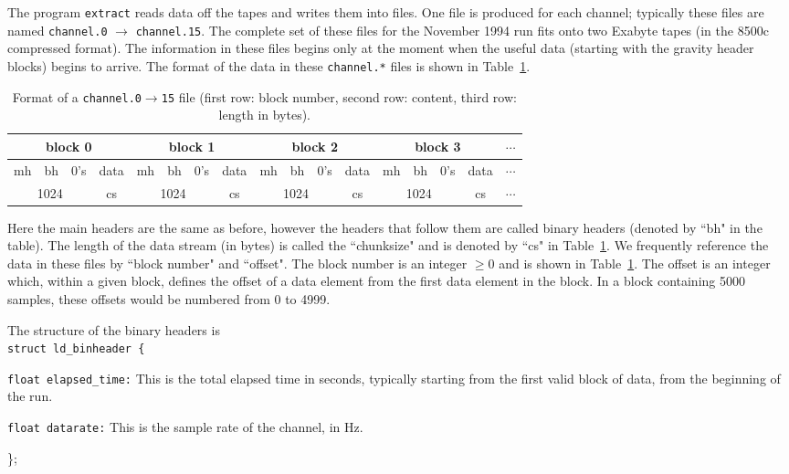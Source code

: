 The program {\tt extract} reads data off the tapes and writes them into
files.  One file is produced for each channel; typically these files
are named {\tt channel.0} $\rightarrow$ {\tt channel.15}.  The complete
set of these files for the November 1994 run fits onto two Exabyte
tapes (in the 8500c compressed format).  The information in these files
begins only at the moment when the useful data (starting with the
gravity header blocks) begins to arrive.  The format of the data in
these {\tt channel.*} files is shown in Table~\ref{t:datafile}.
\begin{table}[h]
\begin{tabular}[]{|c|c|c|c|c|c|c|c|c|c|c|c|c|c|c|c|c}
\hline
\multicolumn{4}{|c|}{block 0} &  \multicolumn{4}{|c|}{block 1} & \multicolumn{4}{|c|}{block 2}  &\multicolumn{4}{|c|}{block 3} & $\cdots$ \\
\hline
mh &bh & 0's               & data &mh &bh & 0's               & data & mh &bh & 0's              & data & mh &bh & 0's              & data & $\cdots$ \\ 
\hline
\multicolumn{3}{|c|}{1024} & cs   &\multicolumn{3}{|c|}{1024} & cs   &\multicolumn{3}{|c|}{1024} & cs   &\multicolumn{3}{|c|}{1024} & cs   & $\cdots$ \\ 
\hline
\end{tabular}
\caption{Format of a {\tt channel.0$\rightarrow$15} file (first row:
block number, second row: content, third row: length in bytes).}
\label{t:datafile}
\end{table}
Here the main headers are the same as before, however the headers that
follow them are called binary headers (denoted by ``bh" in the table).
The length of the data stream (in bytes) is called the ``chunksize" and
is denoted by ``cs" in Table~\ref{t:datafile}.  We frequently reference
the data in these files by ``block number" and ``offset".  The block
number is an integer $\ge 0$ and is shown in Table~\ref{t:datafile}.
The offset is an integer which, within a given block, defines the
offset of a data element from the first data element in the block.  In
a block containing 5000 samples, these offsets would be numbered from 0
to 4999.

The structure of the binary headers is\\
{\tt struct ld\_binheader \{}
\begin{description}
  \item{\tt float elapsed\_time:} This is the total elapsed time in
  seconds, typically starting from the first valid block of
    data, from the beginning of the run.
  \item{\tt float datarate:}  This is the sample rate of the channel, in Hz.
\end{description}
\};

